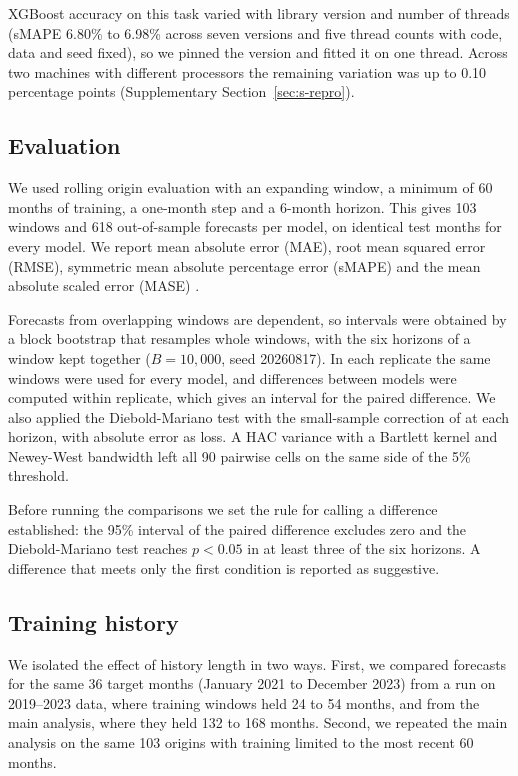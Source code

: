 XGBoost accuracy on this task varied with library version and number of threads (sMAPE
6.80\% to 6.98\% across seven versions and five thread counts with code, data and seed
fixed), so we pinned the version and fitted it on one thread. Across two machines with
different processors the remaining variation was up to 0.10 percentage points
(Supplementary Section~\ref{sec:s-repro}).

\subsection{Evaluation}

We used rolling origin evaluation \citep{tashman2000} with an expanding window, a minimum of
60 months of training, a one-month step and a 6-month horizon. This gives 103 windows and
618 out-of-sample forecasts per model, on identical test months for every model. We report
mean absolute error (MAE), root mean squared error (RMSE), symmetric mean absolute percentage
error (sMAPE) and the mean absolute scaled error (MASE) \citep{hyndman2006}.

Forecasts from overlapping windows are dependent, so intervals were obtained by a block
bootstrap that resamples whole windows, with the six horizons of a window kept together
($B=10{,}000$, seed 20260817). In each replicate the same windows were used for every model,
and differences between models were computed within replicate, which gives an interval for
the paired difference. We also applied the Diebold-Mariano test \citep{diebold1995} with the
small-sample correction of \citet{harvey1997} at each horizon, with absolute error as loss.
A HAC variance with a Bartlett kernel and Newey-West bandwidth left all 90 pairwise cells on
the same side of the 5\% threshold.

Before running the comparisons we set the rule for calling a difference established: the
95\% interval of the paired difference excludes zero and the Diebold-Mariano test reaches
$p<0.05$ in at least three of the six horizons. A difference that meets only the first
condition is reported as suggestive.

\subsection{Training history}

We isolated the effect of history length in two ways. First, we compared forecasts for the
same 36 target months (January 2021 to December 2023) from a run on 2019--2023 data, where
training windows held 24 to 54 months, and from the main analysis, where they held 132 to
168 months. Second, we repeated the main analysis on the same 103 origins with training
limited to the most recent 60 months.

